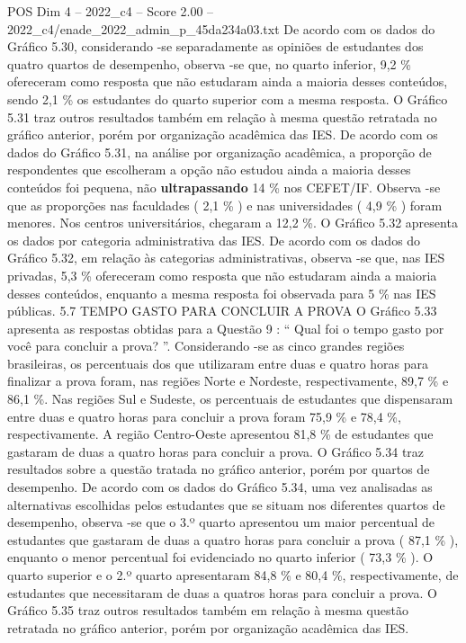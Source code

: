 \begin{textsample}{POS Dim 4 – 2022\_c4 – Score 2.00 – 2022\_c4/enade\_2022\_admin\_p\_45da234a03.txt}
De acordo com os dados do Gráfico 5.30, considerando -se separadamente as opiniões de estudantes dos quatro quartos de desempenho, observa -se que, no quarto inferior, 9,2 \% ofereceram como resposta que não estudaram ainda a maioria desses conteúdos, sendo 2,1 \% os estudantes do quarto superior com a mesma resposta.
O Gráfico 5.31 traz outros resultados também em relação à mesma questão retratada no gráfico anterior, porém por organização acadêmica das IES.
De acordo com os dados do Gráfico 5.31, na análise por organização acadêmica, a proporção de respondentes que escolheram a opção não estudou ainda a maioria desses conteúdos foi pequena, não \textbf{ultrapassando} 14 \% nos CEFET/IF.
Observa -se que as proporções nas faculdades ( 2,1 \% ) e nas universidades ( 4,9 \% ) foram menores.
Nos centros universitários, chegaram a 12,2 \%.
O Gráfico 5.32 apresenta os dados por categoria administrativa das IES.
De acordo com os dados do Gráfico 5.32, em relação às categorias administrativas, observa -se que, nas IES privadas, 5,3 \% ofereceram como resposta que não estudaram ainda a maioria desses conteúdos, enquanto a mesma resposta foi observada para 5 \% nas IES públicas. 5.7 TEMPO GASTO PARA CONCLUIR A PROVA O Gráfico 5.33 apresenta as respostas obtidas para a Questão 9 : “ Qual foi o tempo gasto por você para concluir a prova? ”.
Considerando -se as cinco grandes regiões brasileiras, os percentuais dos que utilizaram entre duas e quatro horas para finalizar a prova foram, nas regiões Norte e Nordeste, respectivamente, 89,7 \% e 86,1 \%.
Nas regiões Sul e Sudeste, os percentuais de estudantes que dispensaram entre duas e quatro horas para concluir a prova foram 75,9 \% e 78,4 \%, respectivamente.
A região Centro-Oeste apresentou 81,8 \% de estudantes que gastaram de duas a quatro horas para concluir a prova.
O Gráfico 5.34 traz resultados sobre a questão tratada no gráfico anterior, porém por quartos de desempenho.
De acordo com os dados do Gráfico 5.34, uma vez analisadas as alternativas escolhidas pelos estudantes que se situam nos diferentes quartos de desempenho, observa -se que o 3.º quarto apresentou um maior percentual de estudantes que gastaram de duas a quatro horas para concluir a prova ( 87,1 \% ), enquanto o menor percentual foi evidenciado no quarto inferior ( 73,3 \% ).
O quarto superior e o 2.º quarto apresentaram 84,8 \% e 80,4 \%, respectivamente, de estudantes que necessitaram de duas a quatros horas para concluir a prova.
O Gráfico 5.35 traz outros resultados também em relação à mesma questão retratada no gráfico anterior, porém por organização acadêmica das IES.

\end{textsample}
